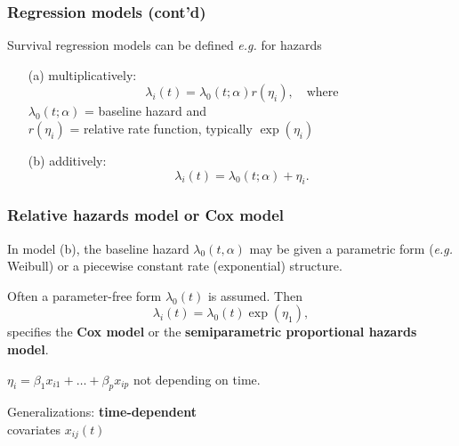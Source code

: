 \documentclass[handout,12pt,dvipsnames,t]{beamer}
\begin{document}
\begin{frame}
\frametitle{Regression models (cont'd)}
  
Survival regression models can be defined \textit{e.g.} for hazards
\begin{itemize}
\item[(a)] multiplicatively: $$ 
\lambda_i(t) = \lambda_0(t; \alpha) r(\eta_i), \quad\text{where}$$
$\lambda_0(t; \alpha)$ = baseline hazard and \\
$r(\eta_i)$ = relative rate function, typically $\exp(\eta_i)$
\medskip
\pause
\item[(b)] additively: 
$$ \lambda_i(t) = \lambda_0(t; \alpha) + \eta_i. $$
\end{itemize}
\end{frame}




\begin{frame}
\frametitle{Relative hazards model or Cox model}

In model (b), the baseline hazard $\lambda_0(t,\alpha)$ may be given a parametric form (\textit{e.g.} Weibull) or
a piecewise constant rate (exponential) structure.

\bigskip
Often a parameter-free form $\lambda_0(t)$ is assumed. Then
\[
  \lambda_i(t) = \lambda_0(t) \exp(\eta_1),
\]
specifies the \textbf{Cox model} or the \textbf{semiparametric proportional hazards model}.

\bigskip
$\eta_i = \beta_1 x_{i1} + \dots + \beta_p x_{ip}$ not depending on time.  

\bigskip
Generalizations: \textbf{time-dependent} \\ covariates $x_{ij}(t)$



\end{frame}
\end{document}
